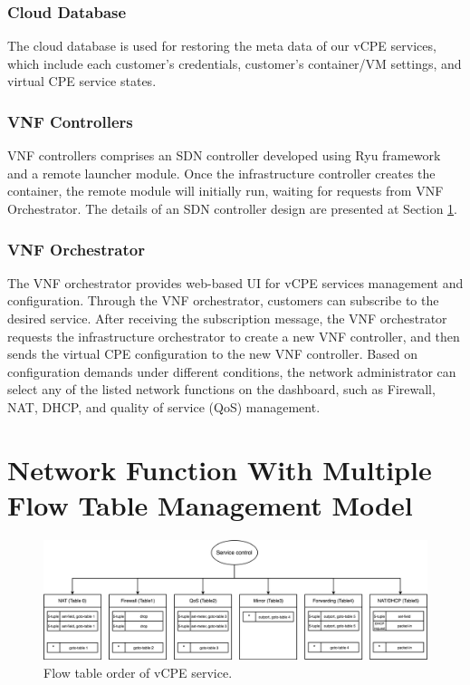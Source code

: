 \documentclass[conference]{IEEEtran}
\begin{document}
\subsubsection{Cloud Database}
The cloud database is used for restoring the meta data of our vCPE services, which include each customer’s credentials, customer's container/VM settings, and virtual CPE service states.

\subsubsection{VNF Controllers}
VNF controllers comprises an SDN controller developed using Ryu framework \cite{ryu} and a remote launcher module. Once the infrastructure controller creates the container, the remote module will initially run, waiting for requests from VNF Orchestrator. The details of an SDN controller design are presented at Section \ref{sec:mft}.

\subsubsection{VNF Orchestrator}
The VNF orchestrator provides web-based UI for vCPE services management and configuration. Through the VNF orchestrator, customers can subscribe to the desired service. After receiving the subscription message, the VNF orchestrator requests the infrastructure orchestrator to create a new VNF controller, and then sends the virtual CPE configuration to the new VNF controller. Based on configuration demands under different conditions, the network administrator can select any of the listed network functions on the dashboard, such as Firewall, NAT, DHCP, and quality of service (QoS) management.





\section{Network Function With Multiple Flow Table Management Model} \label{sec:mft}

\begin{figure}[!t]
\centering
\includegraphics[width=\textwidth]{./figures/mft_table_overview}
\caption{Flow table order of vCPE service.}
\label{fig:mft_table_overview}
\end{figure}
\end{document}
